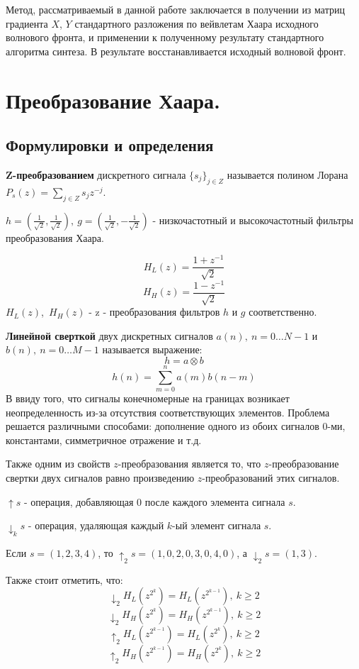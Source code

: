 \documentclass[oneside, final, 14pt]{extreport}
\begin{document}
Метод, рассматриваемый в данной работе заключается в получении из матриц градиента $X$, $Y$ стандартного разложения по вейвлетам Хаара исходного волнового фронта, и применении к полученному результату стандартного алгоритма синтеза. В результате восстанавливается исходный волновой фронт.


\chapter{Преобразование Хаара.}
\section{Формулировки и определения}
\textbf{Z-преобразованием} дискретного сигнала $\{s_j\}_{ j \in Z}$ называется полином Лорана 
$P_{s}(z) = \sum_{j \in Z} s_{j}z^{-j}$.

$h = (\frac{1}{\sqrt{2}}, \frac{1}{\sqrt{2}}),~g = (\frac{1}{\sqrt{2}}, -\frac{1}{\sqrt{2}})$ - низкочастотный и высокочастотный фильтры преобразования Хаара.

$$ H_{L}(z) = \frac{1 + z^{-1}}{\sqrt{2}} $$
$$ H_{H}(z) = \frac{1 - z^{-1}}{\sqrt{2}} $$
$H_{L}(z)$,~$H_{H}(z)$ - z - преобразования фильтров $h$ и $g$ соответственно.

\textbf{Линейной сверткой} двух дискретных сигналов $a(n),~ n=0 \ldots N-1$ и $b(n),~ n=0 \ldots M-1$ называется выражение:
$$ h = a \otimes b $$
$$ h(n) =  \sum_{m=0}^{n} a(m)b(n-m) $$
В ввиду того, что сигналы конечномерные на границах возникает неопределенность из-за отсутствия соответствующих элементов. Проблема решается различными способами: дополнение одного из обоих сигналов $0$-ми, константами, симметричное отражение и т.д.

Также одним из свойств $z$-преобразования является то, что $z$-преобразование свертки двух сигналов равно произведению $z$-преобразований этих сигналов. 

\textbf{$\uparrow s$} - операция, добавляющая $0$ после каждого элемента сигнала $s$.

\textbf{$\downarrow_k s$} - операция, удаляющая каждый $k$-ый элемент сигнала $s$.

Если $s = (1,2,3,4)$, то $\uparrow_2 s = (1,0,2,0,3,0,4,0)$, а $\downarrow_{2} s = (1,3)$.

Также стоит отметить, что:
$$\downarrow_2 H_L(z^{2^k}) = H_L(z^{2^{k-1}}),~ k\geq 2$$
$$\downarrow_2 H_H(z^{2^k}) = H_H(z^{2^{k-1}}),~ k\geq 2$$
$$\uparrow_2 H_L(z^{2^{k-1}}) = H_L(z^{2^{k}}),~ k\geq 2$$
$$\uparrow_2 H_H(z^{2^{k-1}}) = H_H(z^{2^{k}}),~ k\geq 2$$
\end{document}
